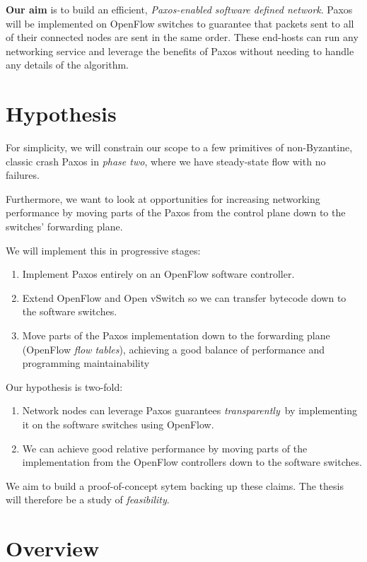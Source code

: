 \textbf{Our aim} is to build an efficient, \textit{Paxos-enabled software defined
network}.  Paxos will be implemented on OpenFlow switches to guarantee that
packets sent to all of their connected nodes are sent in the same order.
These end-hosts can run any networking service and leverage the benefits of
Paxos without needing to handle any details of the algorithm.

\section{Hypothesis}

For simplicity, we will constrain our scope to a few primitives of
non-Byzantine, classic crash Paxos in \textit{phase two}, where we have
steady-state flow with no failures.

Furthermore, we want to look at opportunities for increasing networking
performance by moving parts of the Paxos from the control plane down to the
switches' forwarding plane.

We will implement this in progressive stages:

\begin{enumerate}
\item Implement Paxos entirely on an OpenFlow software controller.
\item Extend OpenFlow and Open vSwitch so we can transfer bytecode down to
the software switches.
\item Move parts of the Paxos implementation down to the forwarding plane
(OpenFlow \textit{flow tables}), achieving a good balance of performance and
programming maintainability
\end{enumerate}

Our hypothesis is two-fold:

\begin{enumerate}
\item Network nodes can leverage Paxos guarantees \textit{transparently} by
implementing it on the software switches using OpenFlow.
\item We can achieve good relative performance by moving parts of the
implementation from the OpenFlow controllers down to the software switches.
\end{enumerate}

We aim to build a proof-of-concept sytem backing up these claims.  The
thesis will therefore be a study of \textit{feasibility}.

\section{Overview}

